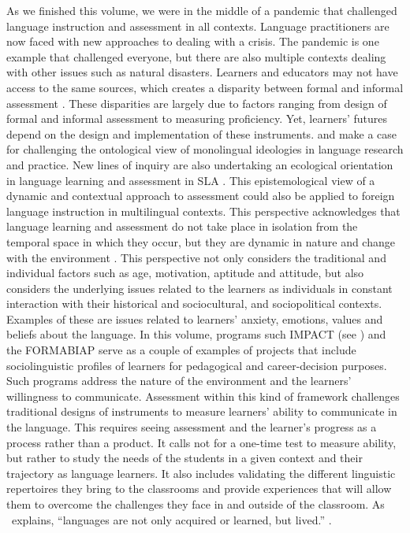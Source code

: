 \documentclass[output=paper]{langscibook}
\begin{document}
As we finished this volume, we were in the middle of a pandemic that challenged language instruction and assessment in all contexts. Language practitioners are now faced with new approaches to dealing with a crisis. The pandemic is one example that challenged everyone, but there are also multiple contexts dealing with other issues such as natural disasters. Learners and educators may not have access to the same sources, which creates a disparity between formal and informal assessment \citep{MenkeMalovhr2021}. These disparities are largely due to factors ranging from design of formal and informal assessment to measuring proficiency. Yet, learners' futures depend on the design and implementation of these instruments. \citet{Ortega2017} and \citet{MazakCarroll2016} make a case for challenging the ontological view of monolingual ideologies in language research and practice. New lines of inquiry are also undertaking an ecological orientation in language learning and assessment in SLA \citep{Larsen-Freeman2017}. This epistemological view of a dynamic and contextual approach to assessment could also be applied to foreign language instruction in multilingual contexts. This perspective acknowledges that language learning and assessment do not take place in isolation from the temporal space in which they occur, but they are dynamic in nature and change with the environment \citep{Larsen-Freeman2017}. This perspective not only considers the traditional and individual factors such as age, motivation, aptitude and attitude, but also considers the underlying issues related to the learners as individuals in constant interaction with their historical and sociocultural, and sociopolitical contexts. Examples of these are issues related to learners' anxiety, emotions, values and beliefs about the language. In this volume, programs such IMPACT (see ) and the FORMABIAP  serve as a couple of examples of projects that include sociolinguistic profiles of learners for pedagogical and career-decision purposes. Such programs address the nature of the environment and the learners’ willingness to communicate. Assessment within this kind of framework challenges traditional designs of instruments to measure learners’ ability to communicate in the language. This requires seeing assessment and the learner’s progress as a process rather than a product. It calls not for a one-time test to measure ability, but rather to study the needs of the students in a given context and their trajectory as language learners. It also includes validating the different linguistic repertoires they bring to the classrooms and provide experiences that will allow them to overcome the challenges they face in and outside of the classroom. As \citet{Larsen-Freeman2017}~explains, “languages are not only acquired or learned, but lived.” \citep{Rosi.Solé2016}.
\end{document}
